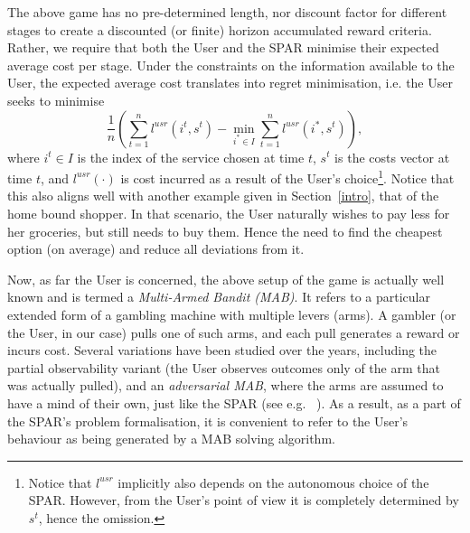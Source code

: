 \documentclass{msdm2012}
\begin{document}
The above game has no pre-determined length, nor discount factor for
different stages to create a discounted (or finite) horizon
accumulated reward criteria. Rather, we require that both the User and
the SPAR minimise their expected average cost per stage. Under the constraints on the information available to the User, the expected average cost translates into regret minimisation, i.e. the User seeks to minimise
$$%
\frac{1}{n}\left(
\sum\limits_{t=1}^n l^{usr}(i^t,s^t)- \min\limits_{i^*\in
  I}\sum\limits_{t=1}^n l^{usr}(i^*,s^t)\right),$$%
where $i^t\in I$
is the index of the service chosen at time $t$, $s^t$ is the costs vector at time $t$, and $l^{usr}(\cdot)$
is cost incurred as a result of the User's choice\footnote{Notice that $l^{usr}$ implicitly also depends on the autonomous choice of the SPAR. However, from the User's point of view it is completely determined by $s^t$, hence the omission.}.
Notice that this also aligns well with
another example given in Section~\ref{intro}, that of the home bound
shopper. In that scenario, the User naturally wishes to pay less for
her groceries, but still needs to buy them. Hence the need to find the
cheapest option (on average) and reduce all deviations from it.

Now, as far the User is concerned, the above setup of the game is
actually well known and is termed a {\em Multi-Armed Bandit (MAB)}. It
refers to a particular extended form of a gambling machine with
multiple levers (arms). A gambler (or the User, in our case) pulls one
of such arms, and each pull generates a reward or incurs
cost. Several variations have been studied over the years, including
the partial observability variant (the User observes outcomes only of
the arm that was actually pulled), and an {\em adversarial MAB}, where
the arms are assumed to have a mind of their own, just like the SPAR
(see e.g. ~\cite{cesa-bianchi_lugosi_2006_book}). As a result, as a
part of the SPAR's problem formalisation, it is convenient to refer to
the User's behaviour as being generated by a MAB solving algorithm.

\end{document}
